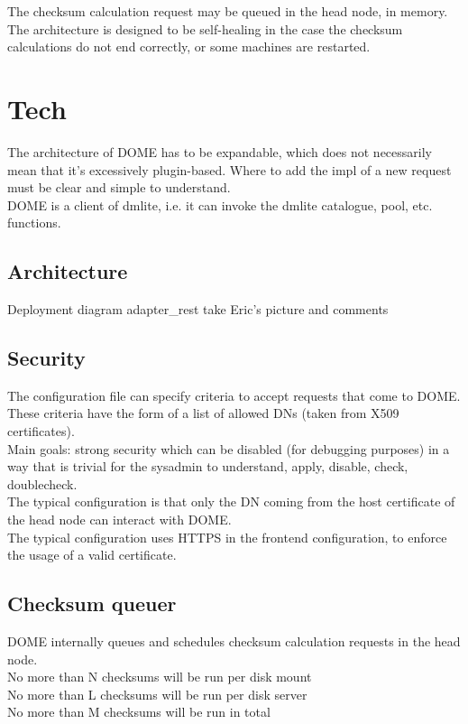 \documentclass[a4paper,10pt]{scrreprt}
\begin{document}
The checksum calculation request may be queued in the head node, in memory. The architecture is designed to be self-healing in the case the checksum
calculations do not end correctly, or some machines are restarted.





\section{Tech}

The architecture of DOME has to be expandable, which does not necessarily mean that it's excessively plugin-based. Where to add the impl of a new request must be clear and simple to understand.\\
DOME is a client of dmlite, i.e. it can invoke the dmlite catalogue, pool, etc. functions.\\

\subsection{Architecture}
Deployment diagram
adapter\_rest
take Eric's picture and comments

\subsection{Security}
The configuration file can specify criteria to accept requests that come to DOME. These criteria have the form
of a list of allowed DNs (taken from X509 certificates).\\

Main goals: strong security which can be disabled (for debugging purposes) in a way that is trivial for the sysadmin to understand, apply, disable, check, doublecheck.\\

The typical configuration is that only the DN coming from the host certificate of the head node can interact with DOME.\\
The typical configuration uses HTTPS in the frontend configuration, to enforce the usage of a valid certificate.\\

\subsection{Checksum queuer}
 DOME internally queues and schedules checksum calculation requests in the head node.\\
 No more than N checksums will be run per disk mount\\
 No more than L checksums will be run per disk server\\
 No more than M checksums will be run in total\\
\end{document}
